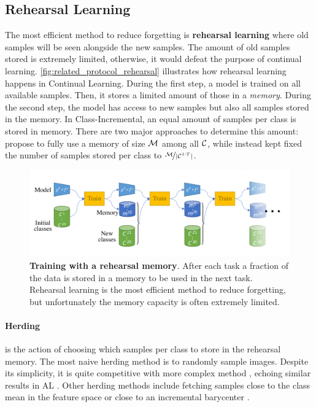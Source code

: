 \subsection{Rehearsal Learning}
\label{sec:related_rehearsal}

The most efficient method to reduce forgetting is \textbf{rehearsal learning} where old samples will
be seen alongside the new samples. The amount of old samples stored is extremely limited, otherwise,
it would defeat the purpose of continual learning. \autoref{fig:related_protocol_rehearsal} illustrates how
rehearsal learning happens in Continual Learning. During the first step, a model is trained on all
available samples. Then, it stores a limited amount of those in a \textit{memory}. During the second
step, the model has access to new samples but also all samples stored in the memory. In
Class-Incremental, an equal amount of samples per class is stored in memory. There are
two major approaches to determine this amount: \cite{rebuffi2017icarl} propose to fully use a
memory of size $\mathcal{M}$ among all $\mathcal{C}$, while \cite{hou2019ucir} instead kept fixed the number of
samples stored per class to $\nicefrac{\mathcal{M}}{|\mathcal{C}^{1:T}|}$.

\begin{figure}[tb]
      \begin{center}
            \includegraphics[width=1.0\linewidth]{images/related/rehearsal}
      \end{center}
      \caption{\textbf{Training with a rehearsal memory}. After each task a fraction of the
            data is stored in a memory to be used in the next task. Rehearsal learning is the most
            efficient method to reduce forgetting, but unfortunately the memory capacity is often
            extremely limited.}
      \label{fig:related_protocol_rehearsal}
\end{figure}

\paragraph{Herding} is the action of choosing which samples per class to store in the rehearsal
memory. The most naive herding method is to randomly sample images. Despite its simplicity, it is
quite competitive with more complex method \citep{castro2018end_to_end_inc_learn}, echoing similar
results in \ac{AL} \citep{gal2017activelearning}. Other herding methods include fetching samples
close to the class mean in the feature space \citep{castro2018end_to_end_inc_learn} or close to an
incremental barycenter \citep{rebuffi2017icarl}.

